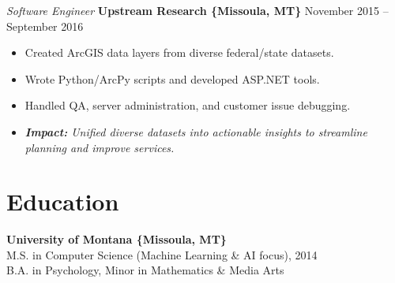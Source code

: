 \documentclass[10pt]{article}
\begin{document}
\textit{Software Engineer} \textbf{Upstream Research \{Missoula, MT\}} \hfill November 2015 -- September 2016
\begin{itemize}
  \item Created ArcGIS data layers from diverse federal/state datasets.
  \item Wrote Python/ArcPy scripts and developed ASP.NET tools.
  \item Handled QA, server administration, and customer issue debugging.
  \item \textit{\textbf{Impact:} Unified diverse datasets into actionable insights to streamline planning and improve services.}
\end{itemize}

\section*{Education}
\textbf{University of Montana \{Missoula, MT\}} \\
M.S. in Computer Science (Machine Learning \& AI focus), 2014 \\
B.A. in Psychology, Minor in Mathematics \& Media Arts
\end{document}
